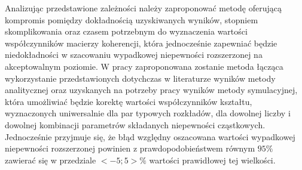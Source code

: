 Analizując przedstawione zależności należy zaproponować metodę oferującą kompromis pomiędzy dokładnością uzyskiwanych wyników, stopniem skomplikowania oraz czasem potrzebnym do wyznaczenia wartości współczynników macierzy koherencji, która jednocześnie zapewniać będzie niedokładności w szacowaniu wypadkowej niepewności rozszerzonej na akceptowalnym poziomie. W pracy zaproponowana zostanie metoda łącząca wykorzystanie przedstawionych dotychczas w literaturze wyników metody analitycznej oraz uzyskanych na potrzeby pracy wyników metody symulacyjnej, która umożliwiać będzie korektę wartości współczynników kształtu, wyznaczonych uniwersalnie dla par typowych rozkładów, dla dowolnej liczby i dowolnej kombinacji parametrów składanych niepewności cząstkowych. Jednocześnie przyjmuje się, że błąd względny oszacowana wartości wypadkowej niepewności rozszerzonej powinien z prawdopodobieństwem równym $95\%$ zawierać się w przedziale $<-5;5> \%$ wartości prawidłowej tej wielkości.

